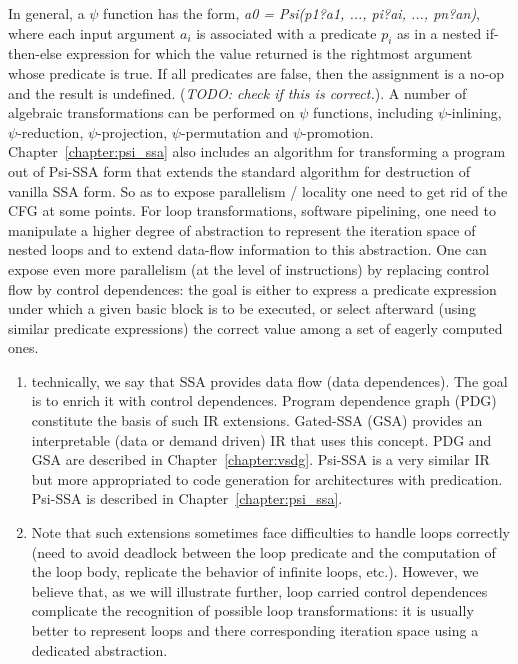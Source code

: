 In general, a $\psi$ function has the form, {\em a0 = Psi(p1?a1, ..., pi?ai, ..., pn?an)}, where each input argument $a_i$ is associated with a predicate $p_i$ as in a nested if-then-else expression for which the value returned is the rightmost argument whose predicate is true.  If all predicates are false, then the assignment is a no-op and the result is undefined.  ({\em TODO: check if this is correct.}).   A number of algebraic transformations can be performed on $\psi$ functions, including 
$\psi$-inlining, $\psi$-reduction, $\psi$-projection, $\psi$-permutation and $\psi$-promotion.  Chapter~\ref{chapter:psi_ssa} also includes an algorithm for transforming a program out of Psi-SSA form that extends the standard algorithm for destruction of vanilla SSA form. So as to expose parallelism / locality one need to get rid of the CFG at some points. For loop transformations, software pipelining, one need  to manipulate a higher degree of abstraction to represent the iteration space of nested loops and to extend data-flow information to this abstraction. One can expose even more parallelism (at the level of instructions) by replacing control flow by control dependences: the goal is either to express a predicate expression under which a given basic block is to be executed, or select afterward (using similar predicate expressions) the correct value among a set of eagerly computed ones.
\begin{enumerate}
\item technically, we say that SSA provides data flow (data dependences). The goal is to enrich it with control dependences. Program dependence graph (PDG) constitute the basis of such IR extensions. Gated-SSA (GSA) provides an interpretable (data or demand driven) IR that uses this concept. PDG and GSA are described in Chapter~\ref{chapter:vsdg}. Psi-SSA is a very similar IR but more appropriated to code generation for architectures with predication. Psi-SSA is described in Chapter~\ref{chapter:psi_ssa}.
\item Note that such extensions sometimes face difficulties to handle loops correctly (need to avoid deadlock between the loop predicate and the computation of the loop body, replicate the behavior of infinite loops, etc.). However, we believe that, as we will illustrate further, loop carried control dependences complicate the recognition of possible loop transformations: it is usually better to represent loops and there corresponding iteration space using a dedicated abstraction. 
\end{enumerate}

